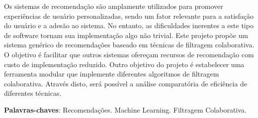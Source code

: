 \documentclass[
	12pt,				%
    oneside,			%
	a4paper,			%
	english,			%
	french,				%
	spanish,			%
	brazil,				%
	]{abntex2}
\begin{document}
\frenchspacing 


\imprimircapa

\imprimirfolhaderosto*






\begin{resumo} %
 Os sistemas de recomendação são amplamente utilizados para promover experiências de usuário personalizadas, 
 sendo um fator relevante para a satisfação do usuário e a adesão ao sistema. No entanto, as dificuldades inerentes a este tipo 
 de software tornam sua implementação algo não trivial. Este projeto propõe um sistema genérico de recomendações
 baseado em técnicas de filtragem colaborativa. O objetivo é facilitar que outros sistemas ofereçam recursos de 
 recomendação com custo de implementação reduzido. Outro objetivo do projeto é estabelecer uma ferramenta modular 
 que implemente diferentes algoritmos de filtragem colaborativa. Através disto, será possível a análise comparatória
 de eficiência de diferentes técnicas.


 \vspace{\onelineskip}
    
 \noindent
 \textbf{Palavras-chaves}: Recomendações. Machine Learning. Filtragem Colaborativa. 
\end{resumo} %
\end{document}

